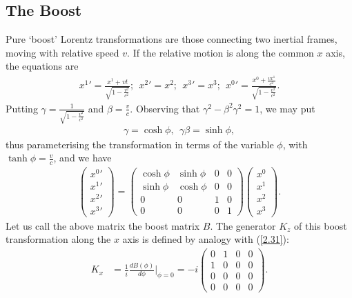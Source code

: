 \documentclass[12pt,a4paper]{report}
\begin{document}
\subsection{The Boost}
Pure `boost' Lorentz transformations are those connecting two inertial frames, moving with relative speed $v$. If the relative motion is along the common $x$ axis, the equations are
\begin{align}
    x^1'=\frac{x^1+vt}{\sqrt{1-\frac{v^2}{c^2}}};~~x^2'=x^2;~~x^3'=x^3;~~x^0'=\frac{x^0+\frac{vx^1}{c^2}}{\sqrt{1-\frac{v^2}{c^2}}}.
\end{align}
Putting $\gamma=\frac{1}{\sqrt{1-\frac{v^2}{c^2}}}$ and $\beta=\frac{v}{c}$. Observing that $\gamma^2-\beta^2\gamma^2=1$, we may put
\begin{align}
    \gamma=\cosh{\phi}, ~~\gamma\beta=\sinh{\phi},
\end{align}
thus parameterising the transformation in terms of the variable $\phi$, with $\tanh{\phi}=\frac{v}{c}$, and we have \cite{Hitoshi, Ryder, balkicm}
\begin{align}
    \begin{pmatrix}
  x^0'\\ 
  x^1'\\
  x^2'\\
  x^3'
\end{pmatrix}=\begin{pmatrix}
  \cosh{\phi} & \sinh{\phi} & 0&0\\ 
  \sinh{\phi} & \cosh{\phi} & 0&0\\
  0 & 0 & 1&0\\
  0&0&0&1
\end{pmatrix}\begin{pmatrix}
  x^0\\ 
  x^1\\
  x^2\\
  x^3
\end{pmatrix}.
\end{align}
Let us call the above matrix the boost matrix $B$. The generator $K_z$ of this boost transformation along the $x$ axis is defined by analogy with (\eqref{2.31}):
\begin{align}
    K_x&=\frac{1}{i}\frac{dB(\phi)}{d\phi}\Bigr|_{\phi=0}=-i\begin{pmatrix}
    0&1&0&0\\
    1&0&0&0\\
    0&0&0&0\\
    0&0&0&0
\end{pmatrix}.
\end{align}
\end{document}
